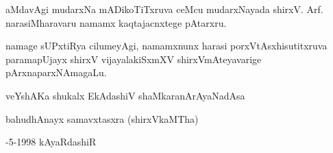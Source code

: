 aMdavAgi mudarxNa mADikoTiTxruva ceMcu mudarxNayada shirxV. Arf. narasiMharavaru namamx kaqtajacnxtege pAtarxru.

namage sUPxtiRya cilumeyAgi, namamxnunx harasi porxVtAsxhisutitxruva paramapUjayx shirxV vijayalakiSxmXV shirxVmAteyavarige pArxnaparxNAmagaLu.

\medskip
veYshAKa shukalx EkAdashiV \hfill  shaMkaranArAyaNadAsa

\medskip
bahudhAnayx samavxtasxra \hfill (shirxVkaMTha)

-5-1998  \hfill kAyaRdashiR
